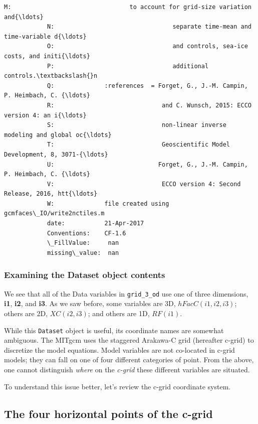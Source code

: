 \documentclass[11pt]{article}
\begin{document}
\begin{Verbatim}[commandchars=\\\{\}]
            M:                                 to account for grid-size variation and{\ldots}
            N:                                 separate time-mean and time-variable d{\ldots}
            O:                                 and controls, sea-ice costs, and initi{\ldots}
            P:                                 additional controls.\textbackslash{}n 
            Q:              :references  = Forget, G., J.-M. Campin, P. Heimbach, C. {\ldots}
            R:                              and C. Wunsch, 2015: ECCO version 4: an i{\ldots}
            S:                              non-linear inverse modeling and global oc{\ldots}
            T:                              Geoscientific Model Development, 8, 3071-{\ldots}
            U:                             Forget, G., J.-M. Campin, P. Heimbach, C. {\ldots}
            V:                              ECCO version 4: Second Release, 2016, htt{\ldots}
            W:              file created using gcmfaces\_IO/write2nctiles.m
            date:           21-Apr-2017
            Conventions:    CF-1.6
            \_FillValue:     nan
            missing\_value:  nan
\end{Verbatim}
            
    \subsubsection{Examining the Dataset object
contents}\label{examining-the-dataset-object-contents}

We see that all of the Data variables in \texttt{grid\_3\_od} use one of
three dimensions, \textbf{i1}, \textbf{i2}, and \textbf{i3}. As we saw
before, some variables are 3D, \(hFacC(i1,i2,i3)\); others are 2D,
\(XC(i2,i3)\); and others are 1D, \(RF(i1)\).

While this \texttt{Dataset} object is useful, its coordinate names are
somewhat ambiguous. The MITgcm uses the staggered Arakawa-C grid
(hereafter c-grid) to discretize the model equations. Model variables
are not co-located in c-grid models; they can fall on one of four
different categories of point. From the above, one cannot distinguish
\emph{where} on the \emph{c-grid} these different variables are
situated.

To understand this issue better, let's review the c-grid coordinate
system.

\subsection{The four horizontal points of the
c-grid}\label{the-four-horizontal-points-of-the-c-grid}
\end{document}
